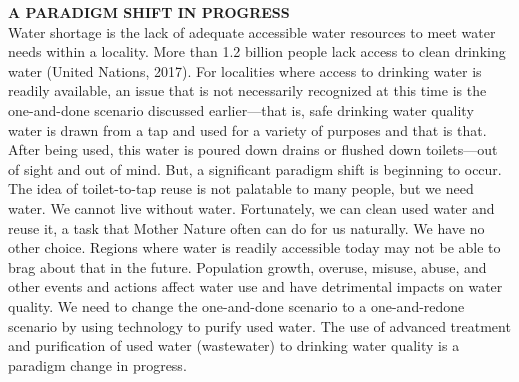\documentclass{article}
\begin{document}
\textbf{A PARADIGM SHIFT IN PROGRESS}\\
Water shortage is the lack of adequate accessible water resources to meet water needs within a locality. More than 1.2 billion people lack access to clean drinking water (United Nations, 2017). For localities where access to drinking water is readily available, an issue that is not necessarily recognized at this time is the one-and-done scenario discussed earlier—that is, safe drinking water quality water is drawn from a tap and used for a variety of purposes and that is that. After being used, this water is poured down drains or flushed down toilets—out of sight and out of mind. But, a significant paradigm shift is beginning to occur. The idea of toilet-to-tap reuse is not palatable to many people, but we need water. We cannot live without water. Fortunately, we can clean used water and reuse it, a task that Mother Nature often can do for us naturally. We have no other choice. Regions where water is readily accessible today may not be able to brag about that in the future. Population growth, overuse, misuse, abuse, and other events and actions affect water use and have detrimental impacts on water quality. We need to change the one-and-done scenario to a one-and-redone scenario by using technology to purify used water. The use of advanced treatment and purification of used water (wastewater) to drinking water quality is a paradigm change in progress.\\
\end{document}

